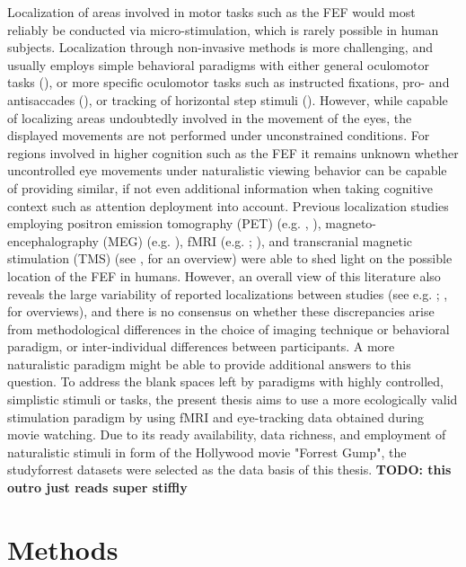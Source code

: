 \documentclass[a4paper, 12pt]{scrreprt}
\begin{document}
Localization of areas involved in motor tasks such as the FEF would most reliably be conducted via micro-stimulation, which is rarely possible in human subjects. Localization through non-invasive methods is more challenging, and usually employs simple behavioral paradigms with either general oculomotor tasks (\cite{paus1996location}), or more specific oculomotor tasks such as instructed fixations, pro- and antisaccades (\cite{connolly2002human}), or tracking of horizontal step stimuli (\cite{alkan2011differentiation}). However, while capable of localizing areas undoubtedly involved in the movement of the eyes, the displayed movements are not performed under unconstrained conditions. For regions involved in higher cognition such as the FEF it remains unknown whether uncontrolled eye movements under naturalistic viewing behavior can be capable of providing similar, if not even additional information when taking cognitive context such as attention deployment into account. Previous localization studies employing positron emission tomography (PET) (e.g. \textcite{paus1996location}, \cite{kawashima1998oculomotor}), magneto-encephalography (MEG) (e.g. \cite{ioannides2004meg}), fMRI (e.g. \cite{petit1999functional}; \cite{connolly2002human}), and transcranial magnetic stimulation (TMS) (see \textcite{vernet2014corrigendum}, for an overview) were able to shed light on the possible location of the FEF in humans. However, an overall view of this literature also reveals the large variability of reported localizations between studies (see e.g. \textcite{paus1996location}; \textcite{vernet2014corrigendum}, for overviews), and there is no consensus on whether these discrepancies arise from methodological differences in the choice of imaging technique or behavioral paradigm, or inter-individual differences between participants. A more naturalistic paradigm might be able to provide additional answers to this question. \newline
To address the blank spaces left by paradigms with highly controlled, simplistic stimuli or tasks, the present thesis aims to use a more ecologically valid stimulation paradigm by using fMRI and eye-tracking data obtained during movie watching. Due to its ready availability, data richness, and employment of naturalistic stimuli in form of the Hollywood movie "Forrest Gump", the studyforrest datasets were selected as the data basis of this thesis. \textbf{TODO: this outro just reads super stiffly}
\section{Methods}
\end{document}
